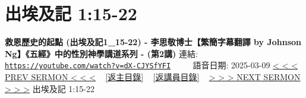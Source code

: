 \documentclass{book}
\begin{document}
\section{出埃及記 1:15-22}
\label{sec:dX_CJYSfYFI}
\textbf{救恩歷史的起點 (出埃及記1\_15-22) - 李思敬博士【繁簡字幕翻譯 by Johnson Ng】《五經》中的性別神學講道系列 - (第2講)}
\newline
\newline
連結: \href{https://youtube.com/watch?v=dX-CJYSfYFI}{\texttt{https://youtube.com/watch?v=dX-CJYSfYFI}} ~~~~ 語音日期: 2025-03-09
\newline
\newline
\hyperref[sec:cau3XNPSx68]{< < < PREV SERMON < < <}
~
\hyperlink{toc}{[返主目錄]}
~
\hyperref[ch:preacher5]{[返講員目錄]}
~
\hyperref[sec:sg1ydBAtBWw]{> > > NEXT SERMON > > >}
\newline
\newline
出埃及記 1:15-22
\newline
\end{document}
